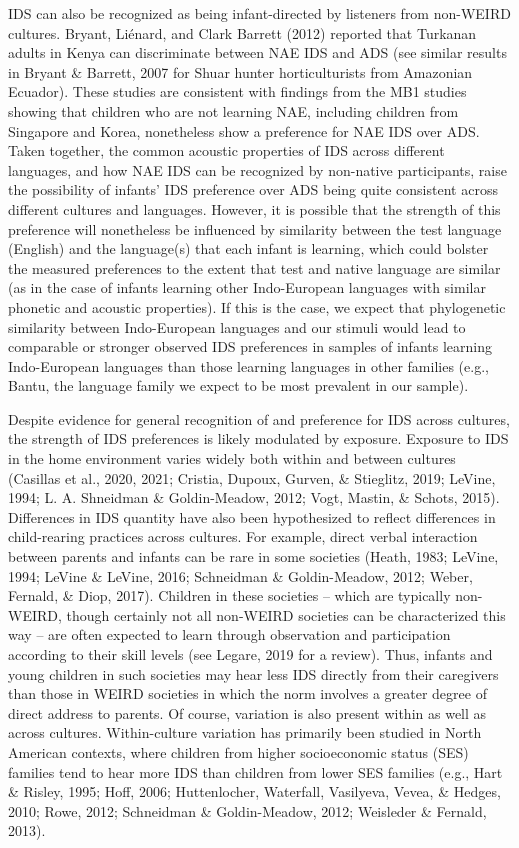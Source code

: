 \documentclass[
  ,man,floatsintext]{apa6}
\begin{document}
IDS can also be recognized as being infant-directed by listeners from non-WEIRD cultures. Bryant, Liénard, and Clark Barrett (2012) reported that Turkanan adults in Kenya can discriminate between NAE IDS and ADS (see similar results in Bryant \& Barrett, 2007 for Shuar hunter horticulturists from Amazonian Ecuador). These studies are consistent with findings from the MB1 studies showing that children who are not learning NAE, including children from Singapore and Korea, nonetheless show a preference for NAE IDS over ADS. Taken together, the common acoustic properties of IDS across different languages, and how NAE IDS can be recognized by non-native participants, raise the possibility of infants' IDS preference over ADS being quite consistent across different cultures and languages. However, it is possible that the strength of this preference will nonetheless be influenced by similarity between the test language (English) and the language(s) that each infant is learning, which could bolster the measured preferences to the extent that test and native language are similar (as in the case of infants learning other Indo-European languages with similar phonetic and acoustic properties). If this is the case, we expect that phylogenetic similarity between Indo-European languages and our stimuli would lead to comparable or stronger observed IDS preferences in samples of infants learning Indo-European languages than those learning languages in other families (e.g., Bantu, the language family we expect to be most prevalent in our sample).

Despite evidence for general recognition of and preference for IDS across cultures, the strength of IDS preferences is likely modulated by exposure. Exposure to IDS in the home environment varies widely both within and between cultures (Casillas et al., 2020, 2021; Cristia, Dupoux, Gurven, \& Stieglitz, 2019; LeVine, 1994; L. A. Shneidman \& Goldin-Meadow, 2012; Vogt, Mastin, \& Schots, 2015). Differences in IDS quantity have also been hypothesized to reflect differences in child-rearing practices across cultures. For example, direct verbal interaction between parents and infants can be rare in some societies (Heath, 1983; LeVine, 1994; LeVine \& LeVine, 2016; Schneidman \& Goldin-Meadow, 2012; Weber, Fernald, \& Diop, 2017). Children in these societies -- which are typically non-WEIRD, though certainly not all non-WEIRD societies can be characterized this way -- are often expected to learn through observation and participation according to their skill levels (see Legare, 2019 for a review). Thus, infants and young children in such societies may hear less IDS directly from their caregivers than those in WEIRD societies in which the norm involves a greater degree of direct address to parents. Of course, variation is also present within as well as across cultures. Within-culture variation has primarily been studied in North American contexts, where children from higher socioeconomic status (SES) families tend to hear more IDS than children from lower SES families (e.g., Hart \& Risley, 1995; Hoff, 2006; Huttenlocher, Waterfall, Vasilyeva, Vevea, \& Hedges, 2010; Rowe, 2012; Schneidman \& Goldin-Meadow, 2012; Weisleder \& Fernald, 2013).
\end{document}
